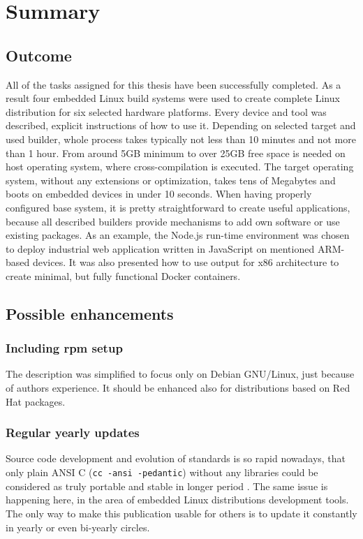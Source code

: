 \documentclass[printmode]{mgr}
\begin{document}
\chapter{Summary}
\label{chapter:conclusions}

\section{Outcome}

All of the tasks assigned for this thesis have been successfully completed.
As a result four embedded Linux build systems were used to create complete Linux distribution for six selected hardware platforms.
Every device and tool was described, explicit instructions of how to use it.
Depending on selected target and used builder, whole process takes typically not less than 10 minutes and not more than 1 hour.
From around 5GB minimum to over 25GB free space is needed on host operating system, where cross-compilation is executed.
The target operating system, without any extensions or optimization, takes tens of Megabytes and boots on embedded devices in under 10 seconds.
When having properly configured base system, it is pretty straightforward to create useful applications, because all described builders provide mechanisms to add own software or use existing packages.
As an example, the Node.js run-time environment was chosen to deploy industrial web application written in  JavaScript on mentioned ARM-based devices.
It was also presented how to use output for x86 architecture to create minimal, but fully functional Docker containers.


\section{Possible enhancements}

\subsection*{Including rpm setup}
The description was simplified to focus only on Debian GNU/Linux, just because of authors experience. It should be enhanced also for distributions based on Red Hat packages.


\subsection*{Regular yearly updates}
Source code development and evolution of standards is so rapid nowadays, that only plain ANSI C (\verb|cc -ansi -pedantic|) without any libraries could be considered as truly portable and stable in longer period .
The same issue is happening here, in the area of embedded Linux distributions development tools.
The only way to make this publication usable for others is to update it constantly in yearly or even bi-yearly circles.
\end{document}
